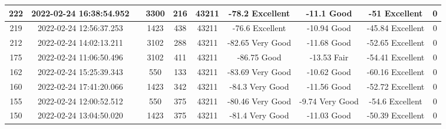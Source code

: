 \begin{longtable*}{|c|c|c|c|c|c|c|c|c|c|}
222&2022-02-24 16:38:54.952&&3300&216&43211& -78.2     Excellent   & -11.1     Good        & -51       Excellent   & 0\\\hline
{}219&2022-02-24 12:56:37.253&&1423&438&43211& -76.6     Excellent   & -10.94    Good        & -45.84    Excellent   & 0\\\hline
{}212&2022-02-24 14:02:13.211&&3102&288&43211& -82.65    Very Good   & -11.68    Good        & -52.65    Excellent   & 0\\\hline
{}175&2022-02-24 11:06:50.496&&3102&411&43211& -86.75    Good        & -13.53    Fair        & -54.41    Excellent   & 0\\\hline
{}162&2022-02-24 15:25:39.343&&550&133&43211& -83.69    Very Good   & -10.62    Good        & -60.16    Excellent   & 0\\\hline
{}160&2022-02-24 17:41:20.066&&1423&342&43211& -84.3     Very Good   & -11.56    Good        & -52.72    Excellent   & 0\\\hline
{}155&2022-02-24 12:00:52.512&&550&375&43211& -80.46    Very Good   & -9.74     Very Good   & -54.6     Excellent   & 0\\\hline
{}150&2022-02-24 13:04:50.020&&1423&375&43211& -81.4     Very Good   & -11.03    Good        & -50.39    Excellent   & 0\\\hline

\end{longtable*}
